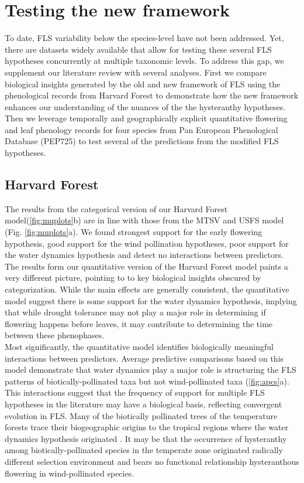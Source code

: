 \documentclass{article}
\begin{document}
\section*{Testing the new framework}
To date, FLS variability below the species-level have not been addressed. Yet, there are datasets widely available that allow for testing these several FLS hypotheses concurrently at multiple taxonomic levels. To address this gap, we supplement our literature review with several analyses. First we compare biological insights generated by the old and new framework of FLS using the phenological records from Harvard Forest to demonstrate how the new framework enhances our understanding of the nuances of the the hysteranthy hypotheses. Then we leverage temporally and geographically explicit quantitative flowering and leaf phenology records for four species from Pan European Phenological Database (PEP725) \citep{PEP725} to test several of the predictions from the modified FLS hypotheses.\\

\subsection*{Harvard Forest}
The results from the categorical version of our Harvard Forest model(\ref{fig:muplots}b) are in line with those from the MTSV and USFS model (Fig. \ref{fig:muplots}a). We found strongest support for the early flowering hypothesis, good support for the wind pollination hypotheses, poor support for the water dynamics hypothesis and detect no interactions between predictors. The results form our quantitative version of the Harvard Forest model paints a very different picture, pointing to to key biological insights obscured by categorization. While the main effects are generally consistent, the quantitative model suggest there is some support for the water dynamics hypothesis, implying that while drought tolerance may not play a major role in determining if flowering happens before leaves, it may contribute to determining the time between these phenophases.\\%

Most significantly, the quantitative model identifies biologically meaningful interactions between predictors. Average predictive comparisons based on this model demonstrate that water dynamics play a major role is structuring the FLS patterns of biotically-pollinated taxa but not wind-pollinated taxa (\ref{fig:apcs}a). This interactions suggest that the frequency of support for multiple FLS hypotheses in the literature may have a biological basis, reflecting convergent evolution in FLS. Many of the biotically pollinated trees of the temperature forests trace their biogeographic origins to the tropical regions where the water dynamics hypothesis originated \citep{Daubenmire1972}. It may be that the occurrence of hysteranthy among biotically-pollinated species in the temperate zone originated radically different selection environment and bears no functional relationship hysteranthous flowering in wind-pollinated species.\\
\end{document}
